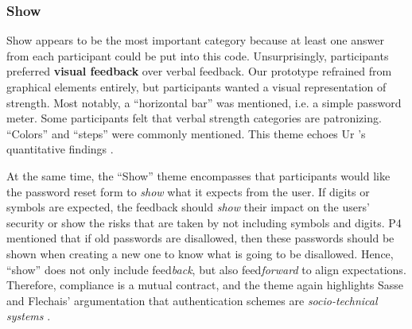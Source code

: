 \subsubsection{Show}
Show appears to be the most important category because at least one answer from each participant could be put into this code. Unsurprisingly, participants preferred \textbf{visual feedback} over verbal feedback. Our prototype refrained from graphical elements entirely, but participants wanted a visual representation of strength. Most notably, a ``horizontal bar'' was mentioned, i.e. a simple password meter. Some participants felt that verbal strength categories are patronizing. ``Colors'' and ``steps'' were commonly mentioned. This theme echoes Ur \etal's quantitative findings \cite{Ur2017DataDrivenPWMeter}.

At the same time, the ``Show'' theme encompasses that participants would like the password reset form to \textit{show} what it expects from the user. If digits or symbols are expected, the feedback should \textit{show} their impact on the users' security or show the risks that are taken by not including symbols and digits. P4 mentioned that if old passwords are disallowed, then these passwords should be shown when creating a new one to know what is going to be disallowed. Hence, ``show'' does not only include feed\textit{back}, but also feed\textit{forward} to align expectations. Therefore, compliance is a mutual contract, and the theme again highlights Sasse and Flechais' argumentation that authentication schemes are \textit{socio-technical systems} \cite{Sasse2005UsableSecurityPosition}. 


